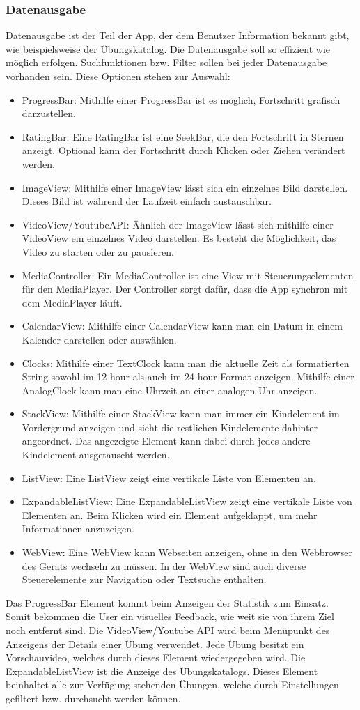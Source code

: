 \documentclass[FIPLY_base.tex]{subfiles}
\begin{document}
\subsubsection{Datenausgabe}
Datenausgabe ist der Teil der App, der dem Benutzer Information bekannt gibt, wie beispielsweise der Übungskatalog.
Die Datenausgabe soll so effizient wie möglich erfolgen. Suchfunktionen bzw. Filter sollen bei jeder Datenausgabe vorhanden sein.
Diese Optionen stehen zur Auswahl:
\begin{itemize}
	\item ProgressBar: Mithilfe einer ProgressBar ist es möglich, Fortschritt grafisch darzustellen. 
	\item RatingBar: Eine RatingBar ist eine SeekBar, die den Fortschritt in Sternen anzeigt. Optional kann der Fortschritt durch Klicken oder Ziehen verändert werden.
	\item ImageView: Mithilfe einer ImageView lässt sich ein einzelnes Bild darstellen. Dieses Bild ist während der Laufzeit einfach austauschbar.
	\item VideoView/YoutubeAPI: Ähnlich der ImageView lässt sich mithilfe einer VideoView ein einzelnes Video darstellen. Es besteht die Möglichkeit, das Video zu starten oder zu pausieren.  
	\item MediaController: Ein MediaController ist eine View mit Steuerungselementen für den 
	MediaPlayer. Der Controller sorgt dafür, dass die App synchron mit 
	dem MediaPlayer läuft.
	\item CalendarView: Mithilfe einer CalendarView kann man ein Datum in einem Kalender darstellen oder auswählen.
	\item Clocks: Mithilfe einer TextClock kann man die aktuelle Zeit als formatierten String sowohl im 12-hour als auch im 24-hour Format anzeigen. Mithilfe einer AnalogClock kann man eine Uhrzeit an einer analogen Uhr anzeigen.
	\item StackView: Mithilfe einer StackView kann man immer ein Kindelement im Vordergrund anzeigen und sieht die restlichen Kindelemente dahinter angeordnet. Das angezeigte Element kann dabei durch jedes andere Kindelement ausgetauscht werden.
	\item ListView: Eine ListView zeigt eine vertikale Liste von Elementen an.
	\item ExpandableListView: Eine ExpandableListView zeigt eine vertikale Liste von Elementen an. Beim Klicken wird ein Element aufgeklappt, um mehr Informationen anzuzeigen.
	\item WebView: Eine WebView kann Webseiten anzeigen, ohne in den Webbrowser des Geräts wechseln zu müssen. In der WebView sind auch diverse Steuerelemente zur Navigation oder Textsuche enthalten.
\end{itemize}
Das ProgressBar Element kommt beim Anzeigen der Statistik zum Einsatz. Somit bekommen die User ein visuelles Feedback, wie weit sie von ihrem Ziel noch entfernt sind. Die VideoView/Youtube API wird beim Menüpunkt des Anzeigens der Details einer Übung verwendet. Jede Übung besitzt ein Vorschauvideo, welches durch dieses Element wiedergegeben wird. Die ExpandableListView ist die Anzeige des Übungskatalogs. Dieses Element beinhaltet alle zur Verfügung stehenden Übungen, welche durch Einstellungen gefiltert bzw. durchsucht werden können.
 
\end{document}
